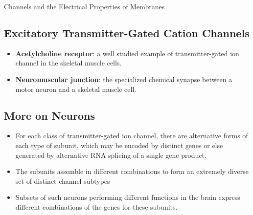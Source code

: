 \documentclass[12pt,letterpaper]{article}
\begin{document}
\begin{secbox}{\hyperlink{11}{Channels and the Electrical Properties of Membranes}}
{    \hypertarget{11.3.14}{\subsection*{Excitatory Transmitter-Gated Cation Channels}}
    \begin{itemize}
        \item \textbf{Acetylcholine receptor}: a well studied example of transmitter-gated ion channel in the skeletal muscle cells. 
        \item \textbf{Neuromuscular junction}: the specialized chemical synapse between a motor neuron and a skeletal muscle cell.
    \end{itemize}

    \hypertarget{11.3.15}{\subsection*{More on Neurons}}
    \begin{itemize}
        \item For each class of transmitter-gated ion channel, there are alternative forms of each type of subunit, which may be encoded by distinct genes or else generated by alternative RNA splicing of a single gene product.
        \item  The subunits assemble in different combinations to form an extremely diverse set of distinct channel subtypes \item Subsets of such neurons performing different functions in the brain express different combinations of the genes for these subunits.
    \end{itemize}
    
}
\end{secbox}
\end{document}
